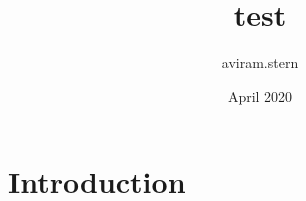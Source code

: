\documentclass{article}
\title{test}
\author{aviram.stern }
\date{April 2020}
\begin{document}
\maketitle

\section{Introduction}
\end{document}
